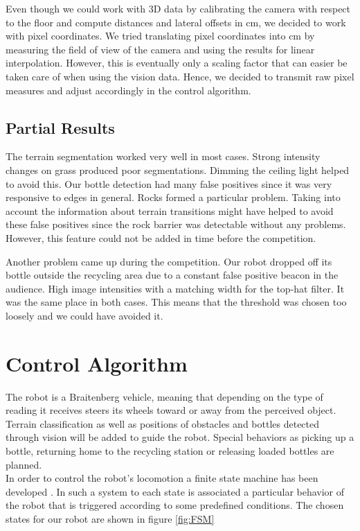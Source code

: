 Even though we could work with 3D data by calibrating the camera with respect to the
floor and compute distances and lateral offsets in cm, we decided to work with pixel
coordinates. We tried translating pixel coordinates into cm by measuring the field of view
of the camera and using the results for linear interpolation. However, this is eventually
only a scaling factor that can easier be taken care of when using the vision data. Hence,
we decided to transmit raw pixel measures and adjust accordingly in the control algorithm.

\subsection{Partial Results}
The terrain segmentation worked very well in most cases. Strong intensity changes on grass
produced poor segmentations. Dimming the ceiling light helped to avoid this. 
Our bottle detection had many false positives since it was very responsive to edges in
general. Rocks formed a particular problem. Taking into account the information
about terrain transitions might have helped to avoid these false positives since the 
rock barrier was detectable without any problems. However, this feature could not 
be added in time before the competition. 

Another problem came up during the competition. Our robot dropped off its bottle 
outside the recycling area due to a constant false positive beacon in the audience. 
High image intensities with a matching width for the top-hat filter.
It was the same place in both cases.
This means that the threshold was chosen too loosely and we could have avoided it.

\section{Control Algorithm}
The robot is a Braitenberg vehicle, meaning that depending on the type
of reading it receives steers its wheels toward or away from the perceived object.
Terrain classification as well as positions of obstacles and bottles detected through
vision will be added to guide the robot. Special behaviors as picking up a bottle,
returning home to the recycling station or releasing loaded bottles are planned.\\

In order to control the robot's locomotion a finite state machine has been developed .
In such a system to each state is associated a particular behavior of the robot that is triggered according to some predefined conditions.
The chosen states for our robot are shown in figure \ref{fig:FSM}\\

